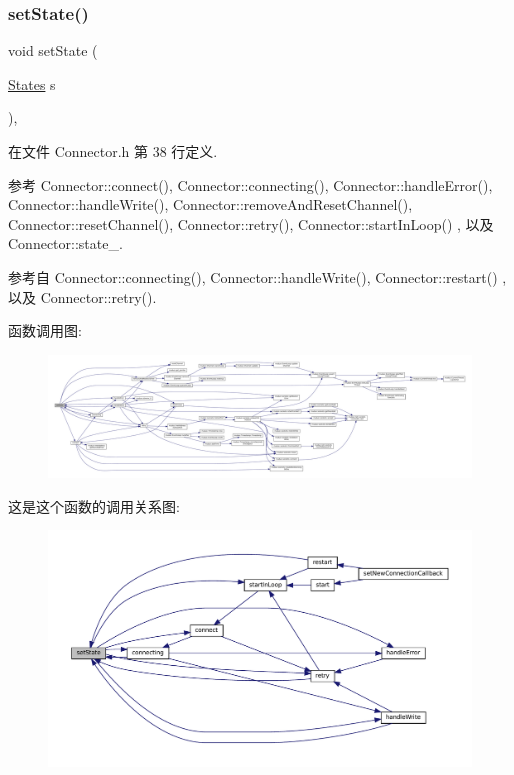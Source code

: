 \subsubsection{\texorpdfstring{set\+State()}{setState()}}
{\footnotesize\ttfamily void set\+State (\begin{DoxyParamCaption}\item[{\hyperlink{classmuduo_1_1Connector_a808e5cd4979462d3bbe3070d7d147444}{States}}]{s }\end{DoxyParamCaption})\hspace{0.3cm}{\ttfamily [inline]}, {\ttfamily [private]}}



在文件 Connector.\+h 第 38 行定义.



参考 Connector\+::connect(), Connector\+::connecting(), Connector\+::handle\+Error(), Connector\+::handle\+Write(), Connector\+::remove\+And\+Reset\+Channel(), Connector\+::reset\+Channel(), Connector\+::retry(), Connector\+::start\+In\+Loop() , 以及 Connector\+::state\+\_\+.



参考自 Connector\+::connecting(), Connector\+::handle\+Write(), Connector\+::restart() , 以及 Connector\+::retry().

函数调用图\+:
\nopagebreak
\begin{figure}[H]
\begin{center}
\leavevmode
\includegraphics[width=350pt]{classmuduo_1_1Connector_ab987a8e9ac6b0ad825674ec2131921af_cgraph}
\end{center}
\end{figure}
这是这个函数的调用关系图\+:
\nopagebreak
\begin{figure}[H]
\begin{center}
\leavevmode
\includegraphics[width=350pt]{classmuduo_1_1Connector_ab987a8e9ac6b0ad825674ec2131921af_icgraph}
\end{center}
\end{figure}
\mbox{\label{classmuduo_1_1Connector_a60de64d75454385b23995437f1d72669}} 
